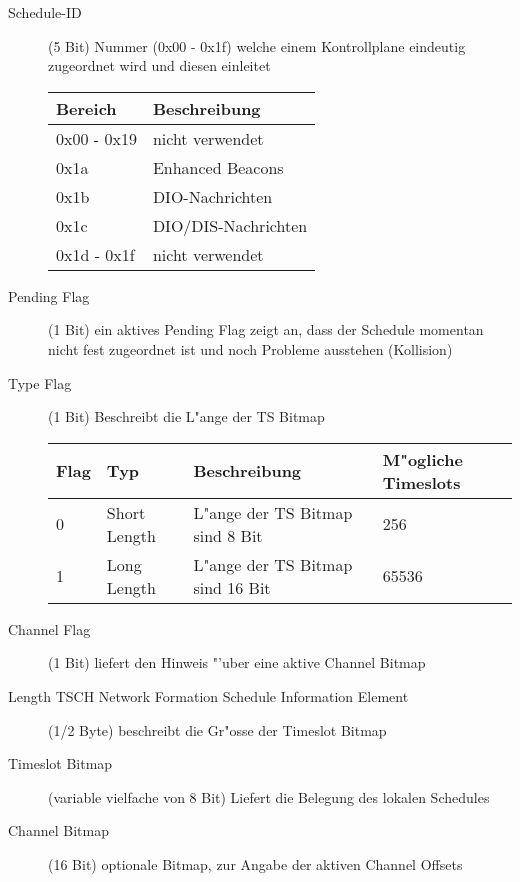 \begin{description}
  \item [Schedule-ID] (5 Bit) Nummer (0x00 - 0x1f) welche einem Kontrollplane eindeutig
  zugeordnet wird und diesen einleitet
    \begin{center}
      \begin{tabular}{ |l|l| }
        \hline
        Bereich & Beschreibung \\ \hline
        0x00 - 0x19 & nicht verwendet \\ \hline
        0x1a & Enhanced Beacons \\ \hline
        0x1b & DIO-Nachrichten \\ \hline
        0x1c & DIO/DIS-Nachrichten \\ \hline
        0x1d - 0x1f & nicht verwendet \\
        \hline
      \end{tabular}
    \end{center}
  \item [Pending Flag] (1 Bit) ein aktives Pending Flag zeigt an, dass der Schedule momentan
  nicht fest zugeordnet ist und noch Probleme ausstehen (Kollision)
  \item [Type Flag] (1 Bit) Beschreibt die L"ange der TS Bitmap
    \begin{center}
      \begin{tabular}{|l|l|l|l|}
        \hline
        Flag & Typ & Beschreibung & M"ogliche Timeslots \\ \hline
        0 & Short Length & L"ange der TS Bitmap sind 8 Bit & 256 \\ \hline
        1 & Long Length & L"ange der TS Bitmap sind 16 Bit & 65536 \\
        \hline
      \end{tabular}
    \end{center}
  \item [Channel Flag] (1 Bit) liefert den Hinweis "'uber eine aktive Channel Bitmap
  \item [Length TSCH Network Formation Schedule Information Element] (1/2 Byte)
  beschreibt die Gr"osse der Timeslot Bitmap
  \item [Timeslot Bitmap] (variable vielfache von 8 Bit) Liefert die Belegung des lokalen
  Schedules
  \item [Channel Bitmap] (16 Bit) optionale Bitmap, zur Angabe der aktiven Channel Offsets
\end{description}
